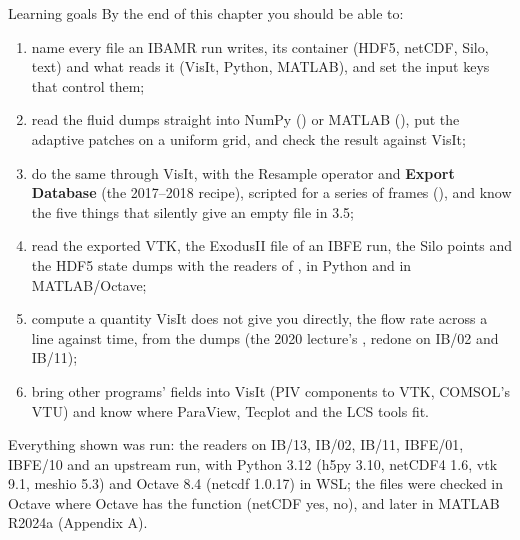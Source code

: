 \documentclass[aspectratio=169,11pt]{beamer}
\newcommand{\gui}[1]{\textsf{\textbf{#1}}}
\begin{document}
\begin{frame}{Learning goals}
\label{fr:goals}
\footnotesize By the end of this chapter you should be able to:
\begin{enumerate}
  \item name every file an IBAMR run writes, its container (HDF5, netCDF, Silo, text) and what reads it (VisIt, Python, MATLAB), and set the input keys that control them;
  \item read the fluid dumps straight into NumPy () or MATLAB (), put the adaptive patches on a uniform grid, and check the result against VisIt;
  \item do the same through VisIt, with the Resample operator and \gui{Export Database} (the 2017--2018 recipe), scripted for a series of frames (), and know the five things that silently give an empty file in 3.5;
  \item read the exported VTK, the ExodusII file of an IBFE run, the Silo points and the HDF5 state dumps with the readers of , in Python and in MATLAB/Octave;
  \item compute a quantity VisIt does not give you directly, the flow rate across a line against time, from the dumps (the 2020 lecture's , redone on IB/02 and IB/11);
  \item bring other programs' fields into VisIt (PIV components to VTK, COMSOL's VTU) and know where ParaView, Tecplot and the LCS tools fit.
\end{enumerate}
\begin{punchbox}
\scriptsize Everything shown was run: the readers on IB/13, IB/02, IB/11, IBFE/01, IBFE/10 and an upstream run, with Python 3.12 (h5py 3.10, netCDF4 1.6, vtk 9.1, meshio 5.3) and Octave 8.4 (netcdf 1.0.17) in WSL; the  files were checked in Octave where Octave has the function (netCDF yes,  no), and  later in MATLAB R2024a (Appendix A).
\end{punchbox}
\end{frame}
\end{document}
